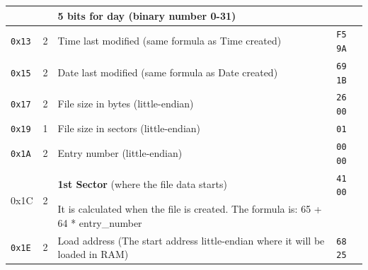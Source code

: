\documentclass[a4paper,11pt]{article}
\begin{document}
\begin{longtable}{ |m{1cm}|m{1.3cm}|m{6.8cm}|m{2.7cm}| }
            & & 5 bits for day (binary number 0-31) &\\
            \hline
            \texttt{0x13} & 2 & Time last modified (same formula as Time created) 
            & \texttt{F5 9A}\\
            \hline
            \texttt{0x15} & 2 & Date last modified (same formula as Date created)
            & \texttt{69 1B}\\
            \hline
            \texttt{0x17} & 2 & File size in bytes (little-endian) & \texttt{26 00}\\
            \hline
            \texttt{0x19} & 1 & File size in sectors (little-endian) & \texttt{01}\\
            \hline
            \texttt{0x1A} & 2 & Entry number (little-endian) & \texttt{00 00}\\
            \hline
            \multirow{2}{4em}{0x1C} & \multirow{2}{4em}{2} & \textbf{1st Sector}
            (where the file data starts) & \texttt{41 00}\\
            & & It is calculated when the file is created. The formula is: 65 + 
            64 * entry\_number &\\
            \hline
            \texttt{0x1E} & 2 & Load address (The start address little-endian
            where it  will be loaded in RAM) & \texttt{68 25}\\
            \hline
        \end{longtable}
\end{document}
